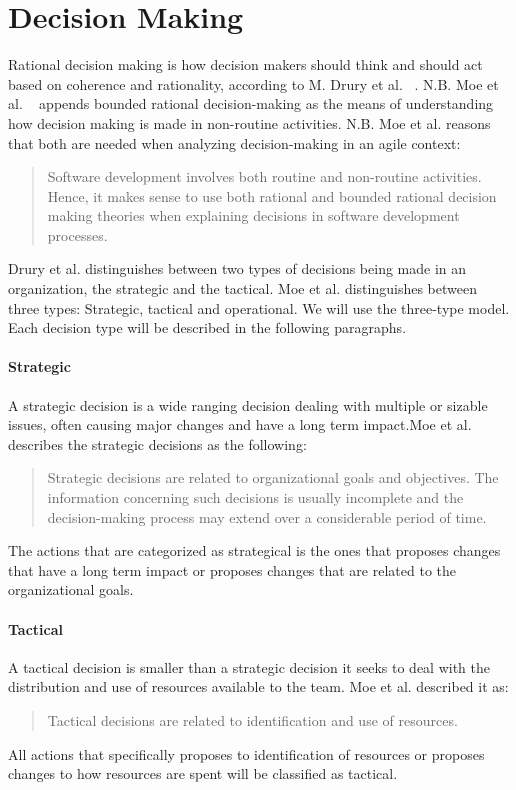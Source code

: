 \section{Decision Making}
Rational decision making is how decision makers should think and should act based on coherence and rationality, according to M. Drury et al. ~\cite{Drury2012}. N.B. Moe et al. ~\cite{Moe2011} appends bounded rational decision-making as the means of understanding how decision making is made in non-routine activities. N.B. Moe et al. reasons that both are needed when analyzing decision-making in an agile context:
\begin{quote}
Software development involves both routine and non-routine activities. Hence, it makes sense to use both rational and bounded rational decision making theories when explaining decisions in software development processes. 
\end{quote}
Drury et al. distinguishes between two types of decisions being made in an organization, the strategic and the tactical. Moe et al. distinguishes between three types: Strategic, tactical and operational. We will use the three-type model. Each decision type will be described in the following paragraphs. 
\paragraph{Strategic}
A strategic decision is a wide ranging decision dealing with multiple or sizable issues, often causing major changes and have a long term impact.Moe et al. describes the strategic decisions as the following: 
\begin{quote}
Strategic decisions are related to organizational goals and objectives. The information concerning such decisions is usually incomplete and the decision-making process may extend over a considerable period of time.
\end{quote}
The actions that are categorized as strategical is the ones that proposes changes that have a long term impact or proposes changes that are related to the organizational goals. 
\paragraph{Tactical}
A tactical decision is smaller than a strategic decision it seeks to deal with the distribution and use of resources available to the team. Moe et al. described it as: 
\begin{quote}
Tactical decisions are related to identification and use of resources.
\end{quote}
All actions that specifically proposes to identification of resources or proposes changes to how resources are spent will be classified as tactical.
